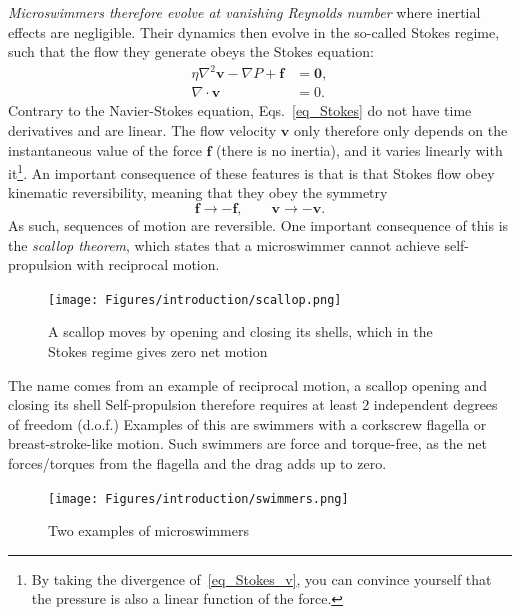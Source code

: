 %
%
\textit{Microswimmers therefore evolve at vanishing Reynolds number} where inertial effects are negligible. 
Their dynamics then evolve in the so-called Stokes regime, 
such that the flow they generate obeys the Stokes equation:
%
\begin{subequations}
\label{eq_Stokes}
\begin{align}
    \label{eq_Stokes_v}
    \eta \nabla^2\bm v -\nabla P + \bm f & = \bm 0, \\
    \label{eq_Stokes_inc}
    \nabla \cdot \bm v & = 0.
\end{align}
\end{subequations}
%
Contrary to the Navier-Stokes equation, Eqs.~\eqref{eq_Stokes} do not have time derivatives and are linear.
The flow velocity $\bm v$ only therefore only depends on the instantaneous value of the force $\bm f$ (there is no inertia), and it varies linearly with it\footnote{By taking the divergence of~\eqref{eq_Stokes_v}, you can convince yourself that the pressure is also a linear function of the force.}. 
An important consequence of these features is that is that Stokes flow obey kinematic reversibility, meaning that they obey the symmetry
%
\begin{equation*}
    \bm f \rightarrow -\bm f, \qquad \bm v \rightarrow -\bm v.
\end{equation*}
%
As such, sequences of motion are reversible.
One important consequence of this is the \emph{scallop theorem}, which states that a microswimmer cannot achieve self-propulsion with reciprocal motion.
%
\begin{figure}[!htb]
    \centering
    \texttt{[image: Figures/introduction/scallop.png]}
    \caption{A scallop moves by opening and closing its shells, which in the Stokes regime gives zero net motion}
    \label{fig: scallop}
\end{figure}

The name comes from an example of reciprocal motion, a scallop opening and closing its shell
Self-propulsion therefore requires at least 2 independent degrees of freedom (d.o.f.)
Examples of this are swimmers with a corkscrew flagella or breast-stroke-like motion.
Such swimmers are force and torque-free, as the net forces/torques from the flagella and the drag adds up to zero.



\begin{figure}[!htb]
    \centering
    \texttt{[image: Figures/introduction/swimmers.png]}
    \caption{Two examples of microswimmers}
    \label{fig: swimmers}
\end{figure}





